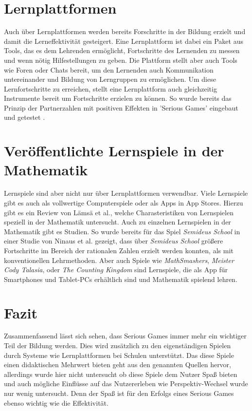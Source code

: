 \section{Lernplattformen}
Auch über Lernplattformen werden bereits Forschritte in der Bildung erzielt und damit die Lerneffektivität gesteigert. Eine Lernplattform ist dabei ein Paket aus Tools, das es dem Lehrenden ermöglicht, Fortschritte des Lernenden zu messen und wenn nötig Hilfestellungen zu geben. Die Plattform stellt aber auch Tools wie Foren oder Chats bereit, um den Lernenden auch Kommunikation untereinander und Bildung von Lerngruppen zu ermöglichen. Um diese Lernfortschritte zu erreichen, stellt eine Lernplattform auch gleichzeitig Instrumente bereit um Fortschritte erzielen zu können. So wurde bereits das Prinzip der Partnerzahlen mit positiven Effekten in 'Serious Games' eingebaut und getestet \cite{JUNG2015}.
\section{Veröffentlichte Lernspiele in der Mathematik}
Lernspiele sind aber nicht nur über Lernplattformen verwendbar. Viele Lernspiele gibt es auch als vollwertige Computerspiele oder als Apps in App Stores. Hierzu gibt es ein Review von Lämsä et al.\cite{Lamsa2018}, welche Charasteristiken von Lernspielen speziell in der Mathematik untersucht. Auch zu einzelnen Lernspielen in der Mathematik gibt es Studien. So wurde bereits für das Spiel \textit{Semideus School}\cite{semideus} in einer Studie von Ninaus et al.\cite{Ninaus2016} gezeigt, dass über \textit{Semideus School} größere Fortschritte im Bereich der rationalen Zahlen erzielt werden konnten, als mit konventionellen Lehrmethoden. Aber auch Spiele wie \textit{MathSmashers}\cite{ludoscience}, \textit{Meister Cody Talasia}\cite{meisterCody}, oder \textit{The Counting Kingdom}\cite{kingdom} sind Lernspiele, die als App für Smartphones und Tablet-PCs erhältlich sind und Mathematik spielend lehren.
\section{Fazit}
Zusammenfassend lässt sich sehen, dass Serious Games immer mehr ein wichtiger Teil der Bildung werden\cite{Hainey2016}\cite{Boyle2016}. Dies wird zusätzlich zu den eigenständigen Spielen durch Systeme wie Lernplattformen bei Schulen unterstützt. Das diese Spiele einen didaktischen Mehrwert bieten geht aus den genannten Quellen hervor, allerdings wurde hier nicht untersucht ob diese Spiele dem Nutzer Spaß bieten und auch mögliche Einflüsse auf das Nutzererleben wie Perspektiv-Wechsel wurde nur wenig untersucht. Denn der Spaß ist für den Erfolgs eines Serious Games ebenso wichtig wie die Effektivität.